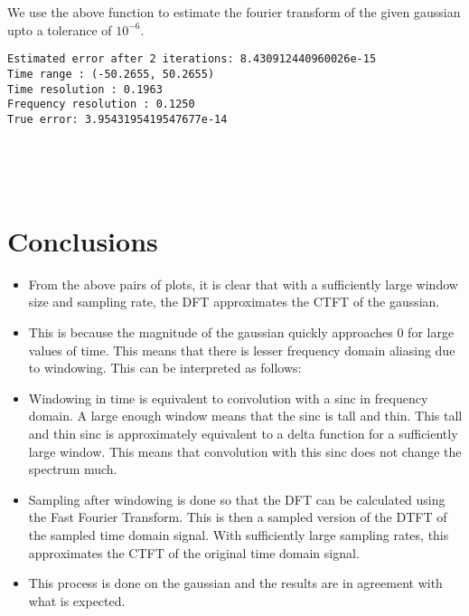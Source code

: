 \documentclass[11pt]{article}
\providecommand{\tightlist}{%
      \setlength{\itemsep}{0pt}\setlength{\parskip}{0pt}}
\begin{document}
	

	

	
		
    We use the above function to estimate the fourier transform of the given
gaussian upto a tolerance of \(10^{-6}\).

	

	

    \begin{Verbatim}[commandchars=\\\{\}]
Estimated error after 2 iterations: 8.430912440960026e-15
Time range : (-50.2655, 50.2655)
Time resolution : 0.1963
Frequency resolution : 0.1250
True error: 3.9543195419547677e-14

    \end{Verbatim}

    \begin{center}
    \end{center}
    { \hspace*{\fill} \\}
    
    \begin{center}
    \end{center}
    { \hspace*{\fill} \\}
    
	
		
    \section{Conclusions}\label{conclusions}

\begin{itemize}
\tightlist
\item
  From the above pairs of plots, it is clear that with a sufficiently
  large window size and sampling rate, the DFT approximates the CTFT of
  the gaussian.
\item
  This is because the magnitude of the gaussian quickly approaches \(0\)
  for large values of time. This means that there is lesser frequency
  domain aliasing due to windowing. This can be interpreted as follows:
\item
  Windowing in time is equivalent to convolution with a sinc in
  frequency domain. A large enough window means that the sinc is tall
  and thin. This tall and thin sinc is approximately equivalent to a
  delta function for a sufficiently large window. This means that
  convolution with this sinc does not change the spectrum much.
\item
  Sampling after windowing is done so that the DFT can be calculated
  using the Fast Fourier Transform. This is then a sampled version of
  the DTFT of the sampled time domain signal. With sufficiently large
  sampling rates, this approximates the CTFT of the original time domain
  signal.
\item
  This process is done on the gaussian and the results are in agreement
  with what is expected.
\end{itemize}

	


    
    
    
    
\end{document}
